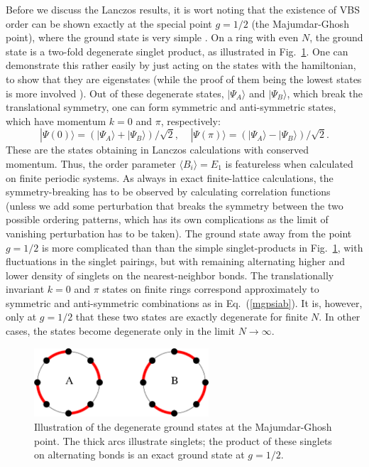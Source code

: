 \documentclass[draft,numberedheadings]{aipproc}
\begin{document}
Before we discuss the Lanczos results, it is wort noting that the existence of VBS order can be shown exactly at the special point $g=1/2$ (the Majumdar-Ghosh 
point), where the ground state is very simple \cite{majumdarghosh}. On a ring with even $N$, the ground state is a two-fold degenerate singlet product, as 
illustrated in Fig.~\ref{vbsring}. One can demonstrate this rather easily by just acting on the states with the hamiltonian, to show that they are eigenstates 
(while the proof of them being the lowest states is more involved \cite{broek80,shastry81,klein82}). Out of these degenerate states, $|\Psi_A\rangle$ and 
$|\Psi_B\rangle$, which break the translational symmetry, one can form symmetric and anti-symmetric states, which have momentum $k=0$ and $\pi$, respectively:
\begin{equation}
|\Psi(0)\rangle = (|\Psi_A\rangle + |\Psi_B\rangle)/\sqrt{2},~~~~~ |\Psi(\pi)\rangle = (|\Psi_A\rangle - |\Psi_B\rangle)/\sqrt{2}.
\label{mgpsiab}
\end{equation}
These are the states obtaining in Lanczos calculations with conserved momentum. Thus, the order parameter $\langle B_i\rangle=E_1$ is featureless when 
calculated on finite periodic systems. As always in exact finite-lattice calculations, the symmetry-breaking has to be observed by calculating correlation 
functions (unless we add some perturbation that breaks the symmetry between the two possible ordering patterns, which has its own complications as the
limit of vanishing perturbation has to be taken). The ground state away from the point $g=1/2$ is more complicated than than the simple singlet-products 
in Fig.~\ref{vbsring}, with fluctuations in the singlet pairings, but with remaining alternating higher and lower density of singlets on the nearest-neighbor bonds. 
The translationally invariant $k=0$ and $\pi$ states on finite rings correspond approximately to symmetric and anti-symmetric combinations as in Eq.~(\ref{mgpsiab}). 
It is, however, only at $g=1/2$ that these two states are exactly degenerate for finite $N$. In other cases, the states become degenerate only in the 
limit $N\to \infty$.

\begin{figure}
\includegraphics[width=6.5cm, clip]{vbsring.eps}
\caption{Illustration of the degenerate ground states at the Majumdar-Ghosh point. The thick arcs illustrate singlets; the
product of these singlets on alternating bonds is an exact ground state at $g=1/2$.} 
\label{vbsring}
\end{figure}
\end{document}
